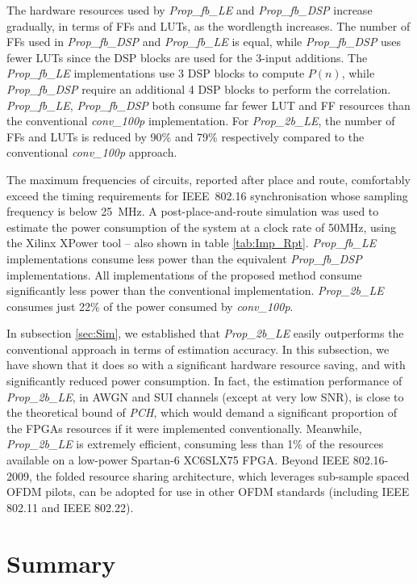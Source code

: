 The hardware resources used by \emph{Prop\_fb\_LE} and \emph{Prop\_fb\_DSP} increase gradually, in terms of FFs and LUTs, as the wordlength increases.
The number of FFs used in \emph{Prop\_fb\_DSP} and \emph{Prop\_fb\_LE} is equal, while \emph{Prop\_fb\_DSP} uses fewer LUTs since the DSP blocks are used for the 3-input additions.
The \emph{Prop\_fb\_LE} implementations use 3 DSP blocks to compute $P(n)$, while \emph{Prop\_fb\_DSP} require an additional 4 DSP blocks to perform the correlation.
\emph{Prop\_fb\_LE}, \emph{Prop\_fb\_DSP} both consume far fewer LUT and FF resources than the conventional \emph{conv\_100p} implementation.
For \emph{Prop\_2b\_LE}, the number of FFs and LUTs is reduced by 90\% and 79\% respectively compared to the conventional \emph{conv\_100p} approach.

The maximum frequencies of circuits, reported after place and route, comfortably exceed the timing requirements for IEEE~802.16 synchronisation whose sampling frequency is below 25~MHz.
A post-place-and-route simulation was used to estimate the power consumption of the system at a clock rate of 50{\thinspace}MHz, using the Xilinx XPower tool -- also shown in table \ref{tab:Imp_Rpt}.
\emph{Prop\_fb\_LE} implementations consume less power than the equivalent \emph{Prop\_fb\_DSP} implementations.
All implementations of the proposed method consume significantly less power than the conventional implementation.
\emph{Prop\_2b\_LE} consumes just 22\% of the power consumed by \emph{conv\_100p}.

In subsection \ref{sec:Sim}, we established that \emph{Prop\_2b\_LE} easily outperforms the conventional approach in terms of estimation accuracy.
In this subsection, we have shown that it does so with a significant hardware resource saving, and with significantly reduced power consumption.
In fact, the estimation performance of \emph{Prop\_2b\_LE}, in AWGN and SUI channels (except at very low SNR), is close to the theoretical bound of \emph{PCH}, which would demand a significant proportion of the FPGAs resources if it were implemented conventionally.
Meanwhile, \emph{Prop\_2b\_LE} is extremely efficient, consuming less than 1\% of the resources available on a low-power Spartan-6 XC6SLX75 FPGA.
Beyond IEEE 802.16-2009, the folded resource sharing architecture, which leverages sub-sample spaced OFDM pilots, can be adopted for use in other OFDM standards (including IEEE 802.11 and IEEE 802.22).

\section{Summary}

